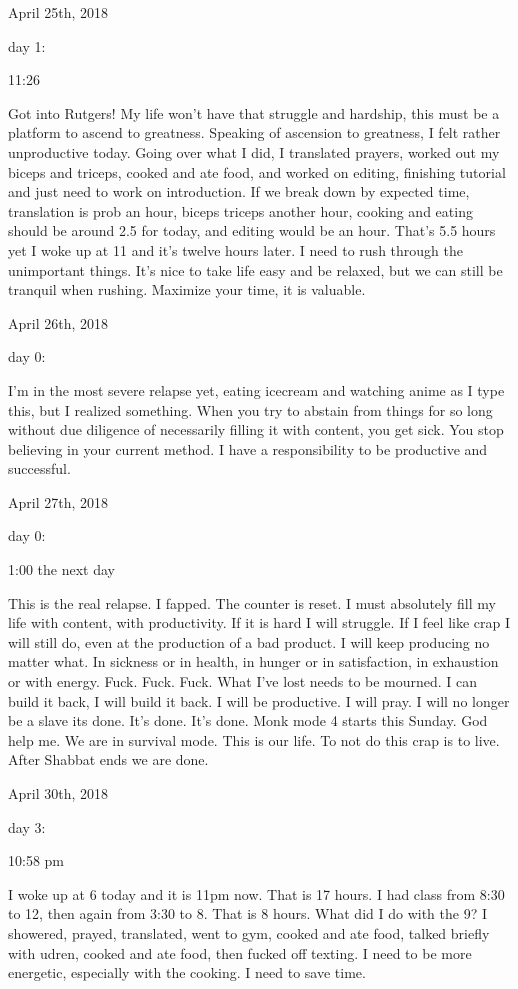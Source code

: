\bigskip
\bigskip
April 25th, 2018

day 1:

11:26

Got into Rutgers! My life won't have that struggle and hardship, this
must be a platform to ascend to greatness. Speaking of ascension to
greatness, I felt rather unproductive today. Going over what I did, I
translated prayers, worked out my biceps and triceps, cooked and ate
food, and worked on editing, finishing tutorial and just need to work on
introduction. If we break down by expected time, translation is prob an
hour, biceps triceps another hour, cooking and eating should be around
2.5 for today, and editing would be an hour. That's 5.5 hours yet I woke
up at 11 and it's twelve hours later. I need to rush through the
unimportant things. It's nice to take life easy and be relaxed, but we
can still be tranquil when rushing. Maximize your time, it is valuable.

\bigskip
\bigskip
April 26th, 2018

day 0:

I'm in the most severe relapse yet, eating icecream and watching anime
as I type this, but I realized something. When you try to abstain from
things for so long without due diligence of necessarily filling it with
content, you get sick. You stop believing in your current method. I have
a responsibility to be productive and successful.

\bigskip
\bigskip
April 27th, 2018

day 0:

1:00 the next day

This is the real relapse. I fapped. The counter is reset. I must
absolutely fill my life with content, with productivity. If it is hard I
will struggle. If I feel like crap I will still do, even at the
production of a bad product. I will keep producing no matter what. In
sickness or in health, in hunger or in satisfaction, in exhaustion or
with energy. Fuck. Fuck. Fuck. What I've lost needs to be mourned. I can
build it back, I will build it back. I will be productive. I will pray.
I will no longer be a slave its done. It's done. It's done. Monk mode 4
starts this Sunday. God help me. We are in survival mode. This is our
life. To not do this crap is to live. After Shabbat ends we are done.

\bigskip
\bigskip
April 30th, 2018

day 3:

10:58 pm

I woke up at 6 today and it is 11pm now. That is 17 hours. I had class
from 8:30 to 12, then again from 3:30 to 8. That is 8 hours. What did I
do with the 9? I showered, prayed, translated, went to gym, cooked and
ate food, talked briefly with udren, cooked and ate food, then fucked
off texting. I need to be more energetic, especially with the cooking. I
need to save time.

